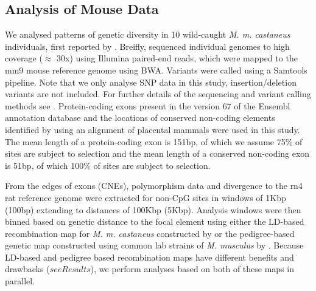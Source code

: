 	

	\subsection*{Analysis of Mouse Data}

	We analysed patterns of genetic diversity in 10 wild-caught \textit{M. m. castaneus} individuals, first reported by \cite{RN122}. Breifly, \cite{RN122} sequenced individual genomes to high coverage ($\approx$ 30x) using Illumina paired-end reads, which were mapped to the mm9 mouse reference genome using BWA. Variants were called using a Samtools pipeline. Note that we only analyse SNP data in this study, insertion/deletion variants are not included. For further details of the sequencing and variant calling methods see \cite{RN122}. Protein-coding exons present in the version 67 of the Ensembl annotation database and the locations of conserved non-coding elements identified by \cite{RN122} using an alignment of placental mammals were used in this study. The mean length of a protein-coding exon is 151bp, of which we assume 75\% of sites are subject to selection and the mean length of a conserved non-coding exon is 51bp, of which 100\% of sites are subject to selection.

	From the edges of exons (CNEs), polymorphism data and divergence to the rn4 rat reference genome were extracted for non-CpG sites in windows of 1Kbp (100bp) extending to distances of 100Kbp (5Kbp). Analysis windows were then binned based on genetic distance to the focal element using either the LD-based recombination map for \textit{M. m. castaneus} constructed by \cite{RN340} or the pedigree-based genetic map constructed using common lab strains of \textit{M. musculus} by \cite{RN232}. Because LD-based and pedigree based recombination maps have different benefits and drawbacks ($see Results$), we perform analyses based on both of these maps in parallel.

